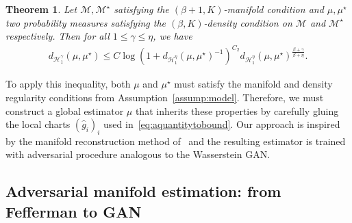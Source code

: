 \documentclass[10pt]{article}
\newtheorem{theorem}{Theorem}
\begin{document}
\begin{theorem}\label{theo:theineqGAW}
 Let $\mathcal{M},\mathcal{M}^\star$ satisfying the $(\beta+1,K)$-manifold  condition and $\mu,\mu^\star$ two probability measures satisfying the  $(\beta,K)$-density condition on $\mathcal{M}$ and $\mathcal{M}^\star$ respectively. Then for all $1\leq \gamma\leq\eta$, we have
    \begin{align*}
        d_{\mathcal{H}^\gamma_1}(\mu,\mu^\star)\leq C\log\left(1+d_{\mathcal{H}^\eta_1}(\mu,\mu^\star)^{-1}\right)^{C_2} d_{\mathcal{H}^\eta_1}(\mu,\mu^\star)^{\frac{\beta+\gamma}{\beta+\eta}}. 
        \end{align*}
\end{theorem} 
To apply this inequality, both $\mu$ and $\mu^\star$ must satisfy the manifold and density regularity conditions from Assumption~\ref{assump:model}. Therefore, we must construct a global estimator $\hat{\mu}$ that inherits these properties by carefully gluing the local charts $(\hat{g}_i)_i$ used in~\eqref{eq:aquantitytobound}. Our approach is inspired by the manifold reconstruction method of~\cite{fefferman2015reconstruction} and the resulting estimator is trained with adversarial procedure analogous to the Wasserstein GAN.










\subsection{Adversarial manifold estimation: from Fefferman to GAN}\label{sec:Feffe}
\end{document}
